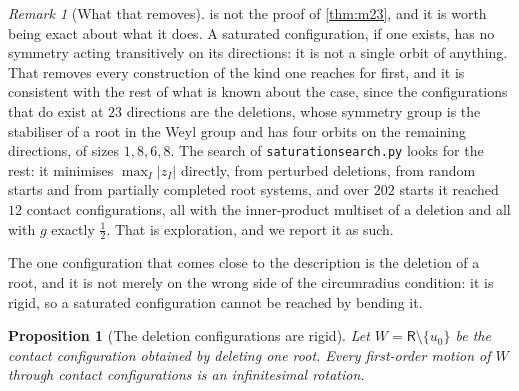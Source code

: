 \documentclass[11pt,reqno]{amsart}
\renewcommand{\_}{\origunderscore\allowbreak}
\numberwithin{equation}{section}
\theoremstyle{plain}
\newtheorem{prop}[thm]{Proposition}
\theoremstyle{definition}
\theoremstyle{remark}
\newtheorem{remark}[thm]{Remark}
\newcommand{\Rt}{\mathsf{R}}                 %
\newcommand{\base}{u}                        %
\begin{document}
\begin{remark}[What that removes]\label{rem:no-transitive}
 is not the proof of \cref{thm:m23}, and it is
worth being exact about what it does. A saturated configuration, if one exists,
has no symmetry acting transitively on its directions: it is not a single
orbit of anything. That removes every construction of the kind one reaches
for first, and it is consistent with the rest of what is known about the
case, since the configurations that do exist at $23$ directions are the
deletions, whose symmetry group is the stabiliser of a root in the Weyl
group and has four orbits on the remaining directions, of sizes
$1,8,6,8$. The search of \texttt{saturation\_search.py} looks for the
rest: it minimises $\max_I|z_I|$ directly, from perturbed deletions, from
random starts and from partially completed root systems, and over $202$
starts it reached $12$ contact configurations, all with the inner-product
multiset of a deletion and all with $g$ exactly $\tfrac12$. That is
exploration, and we report it as such.
\end{remark}

The one configuration that comes close to the description is the
deletion of a root, and it is not merely on the wrong side of the
circumradius condition: it is rigid, so a saturated configuration cannot
be reached by bending it.

\begin{prop}[The deletion configurations are rigid]\label{prop:deletion-rigid}
Let $W=\Rt\setminus\{\base_0\}$ be the contact configuration obtained by
deleting one root. Every first-order motion of $W$ through contact
configurations is an infinitesimal rotation.
\end{prop}
\end{document}

